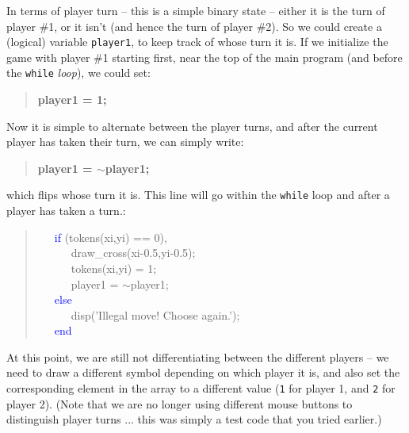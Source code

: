 \documentclass{tufte-book} %
\newenvironment{docspec}{\begin{quotation}\ttfamily\parskip0pt\parindent0pt\ignorespaces}{\end{quotation}}
\newenvironment{docspecbold}{\begin{quotation}\ttfamily\bfseries\parskip0pt\parindent0pt\ignorespaces}{\end{quotation}}
\begin{document}
In terms of player turn -- this is a simple binary state -- either it is the turn of player \#1, or it isn't (and hence the turn of player \#2). So we could create a (logical) variable \texttt{player1}, to keep track of whose turn it is. If we initialize the game with player \#1 starting first, near the top of the main program (and before the \texttt{while} \textit{loop}), we could set:
\begin{docspecbold}
player1 = 1;
\end{docspecbold}

Now it is simple to alternate between the player turns, and after the current player has taken their turn, we can simply write:
\begin{docspecbold}
player1 = \(\sim\)player1;
\end{docspecbold}
which flips whose turn it is. This line will go within the \texttt{while} loop and after a player has taken a turn.:
\begin{docspec}
\ \ \     \textcolor{blue}{if} (tokens(xi,yi) == 0),\\
\ \ \ \ \ \         draw\_cross(xi-0.5,yi-0.5);\\
\ \ \ \ \ \        tokens(xi,yi) = 1;\\
\ \ \ \ \ \         player1 = \(\sim\)player1;\\
\ \ \     \textcolor{blue}{else}\\
\ \ \ \ \ \         disp(\textcolor[rgb]{1,0,1}{'Illegal move! Choose again.'});\\
\ \ \     \textcolor{blue}{end}
\end{docspec}

At this point, we are still not differentiating between the different players -- we need to draw a different symbol depending on which player it is, and also set the corresponding element in the array to a different value (\texttt{1} for player 1, and \texttt{2} for player 2). (Note that we are no longer using different mouse buttons to distinguish player turns ... this was simply a test code that you tried earlier.)
\end{document}
